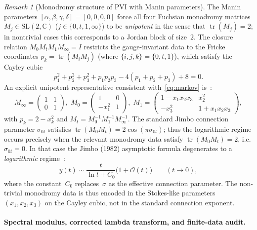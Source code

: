 \documentclass[11pt,a4paper]{article}
\theoremstyle{plain}
\theoremstyle{definition}
\theoremstyle{remark}
\newtheorem{remark}[theorem]{Remark}
\DeclareMathOperator{\tr}{tr}
\newcommand{\CC}{\mathbb{C}}
\newcommand{\Oo}{\mathcal{O}}
\begin{document}
\begin{remark}[Monodromy structure of PVI with Manin parameters]
\label{rem:unipotent}
The Manin parameters $[\alpha,\beta,\gamma,\delta] = [0,0,0,0]$
force all four Fuchsian monodromy matrices $M_j \in \mathrm{SL}(2,\CC)$
($j \in \{0,t,1,\infty\}$) to be \emph{unipotent} in the sense that
$\tr(M_j) = 2$; in nontrivial cases this corresponds to a Jordan block of
size~$2$.
The closure relation $M_0 M_t M_1 M_\infty = I$ restricts
the gauge-invariant data to the Fricke coordinates
$p_k = \tr(M_i M_j)$ (where $\{i,j,k\} = \{0,t,1\}$),
which satisfy the Cayley cubic
\begin{equation}\label{eq:markov}
  p_1^2 + p_2^2 + p_3^2 + p_1 p_2 p_3
  - 4(p_1 + p_2 + p_3) + 8 = 0.
\end{equation}
An explicit unipotent representative consistent with~\eqref{eq:markov}
is~\cite{Jim82}:
\[
  M_\infty = \begin{pmatrix} 1 & 1 \\ 0 & 1 \end{pmatrix},\;
  M_0 = \begin{pmatrix} 1 & 0 \\ -x_1^2 & 1 \end{pmatrix},\;
  M_1 = \begin{pmatrix} 1-x_1 x_2 x_3 & x_2^2 \\
    -x_3^2 & 1+x_1 x_2 x_3 \end{pmatrix},
\]
with $p_k = 2 - x_k^2$ and $M_t = M_0^{-1}M_1^{-1}M_\infty^{-1}$.
%
The standard Jimbo connection parameter
$\sigma_{0t}$ satisfies $\tr(M_0 M_t) = 2\cos(\pi\sigma_{0t})$;
thus the logarithmic regime occurs precisely when the relevant monodromy
data satisfy $\tr(M_0 M_t)=2$, i.e. $\sigma_{0t}=0$.
In that case the Jimbo (1982) asymptotic formula degenerates to
a \emph{logarithmic} regime~\cite{Jim82}:
\begin{equation}\label{eq:jimbo-log}
  y(t) \sim \frac{t}{\ln t + C_0}\bigl(1 + \Oo(t)\bigr)
  \qquad (t \to 0),
\end{equation}
where the constant~$C_0$ replaces~$\sigma$ as the effective
connection parameter.
The non-trivial monodromy data is thus encoded in
the Stokes-like parameters $(x_1, x_2, x_3)$ on the
Cayley cubic, not in the standard connection exponent.
\end{remark}

\paragraph{Spectral modulus, corrected lambda transform, and
  finite-data audit.}
\end{document}
